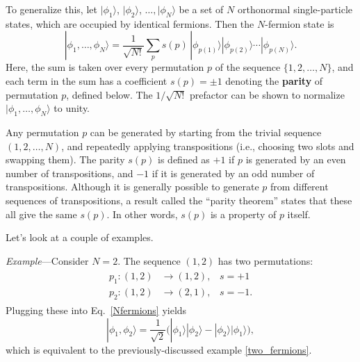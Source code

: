 \documentclass[prx,12pt]{revtex4-2}
\begin{document}
To generalize this, let $|\phi_1\rangle$, $|\phi_2\rangle$, $\dots,
|\phi_N\rangle$ be a set of $N$ orthonormal single-particle states,
which are occupied by identical fermions.  Then the $N$-fermion state
is
\begin{equation}
  |\phi_1,\dots,\phi_N\rangle = \frac{1}{\sqrt{N!}} \sum_p s(p)\, |\phi_{p(1)}\rangle |\phi_{p(2)}\rangle \cdots |\phi_{p(N)}\rangle.
  \label{Nfermions}
\end{equation}
Here, the sum is taken over every permutation $p$ of the sequence
$\{1,2,\dots,N\}$, and each term in the sum has a coefficient $s(p) =
\pm1$ denoting the \textbf{parity} of permutation $p$, defined below.
The $1/\sqrt{N!}$ prefactor can be shown to normalize
$|\phi_1,\dots,\phi_N\rangle$ to unity.

Any permutation $p$ can be generated by starting from the trivial
sequence $(1, 2, \dots, N)$, and repeatedly applying transpositions
(i.e., choosing two slots and swapping them).  The parity $s(p)$ is
defined as $+1$ if $p$ is generated by an even number of
transpositions, and $-1$ if it is generated by an odd number of
transpositions.  Although it is generally possible to generate $p$
from different sequences of transpositions, a result called the
``parity theorem'' states that these all give the same $s(p)$.  In
other words, $s(p)$ is a property of $p$ itself.

Let's look at a couple of examples.

\begin{framed}
\noindent
\textit{Example}---Consider $N=2$.  The sequence $(1,2)$
has two permutations:
\begin{align}
  \begin{aligned}
    p_1 : (1,2) &\rightarrow (1,2), \;\;\;s = +1 \\ p_2 : (1,2) &\rightarrow (2,1), \;\;\;s = -1.\end{aligned}
\end{align}
Plugging these into Eq.~\eqref{Nfermions} yields
\begin{equation*}
  |\phi_1,\phi_2\rangle = \frac{1}{\sqrt{2}}
  \Big(|\phi_1\rangle|\phi_2\rangle - |\phi_2\rangle|\phi_1\rangle\Big),
\end{equation*}
which is equivalent to the previously-discussed example
\eqref{two_fermions}.
\end{framed}
\end{document}
